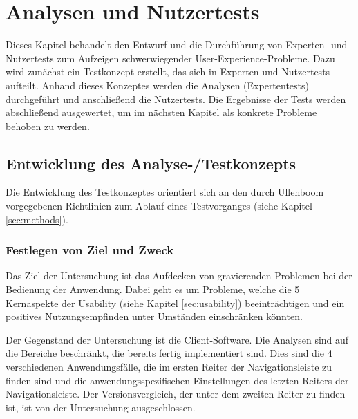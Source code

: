 \chapter{Analysen und Nutzertests} \label{sec:analysisTests}
Dieses Kapitel behandelt den Entwurf und die Durchführung von Experten- und Nutzertests zum Aufzeigen schwerwiegender User-Experience-Probleme. Dazu wird zunächst ein Testkonzept erstellt, das sich in Experten und Nutzertests aufteilt. Anhand dieses Konzeptes werden die Analysen (Expertentests) durchgeführt und anschließend die Nutzertests. Die Ergebnisse der Tests werden abschließend ausgewertet, um im nächsten Kapitel als konkrete Probleme behoben zu werden.\par
\section{Entwicklung des Analyse-/Testkonzepts} \label{sec:analysisConcept}
Die Entwicklung des Testkonzeptes orientiert sich an den durch Ullenboom vorgegebenen Richtlinien zum Ablauf eines Testvorganges (siehe Kapitel \ref{sec:methods}).\par
\subsection{Festlegen von Ziel und Zweck}
Das Ziel der Untersuchung ist das Aufdecken von gravierenden Problemen bei der Bedienung der Anwendung. Dabei geht es um Probleme, welche die 5 Kernaspekte der Usability (siehe Kapitel \ref{sec:usability}) beeinträchtigen und ein positives Nutzungsempfinden unter Umständen einschränken könnten.\par
Der Gegenstand der Untersuchung ist die Client-Software. Die Analysen sind auf die Bereiche beschränkt, die bereits fertig implementiert sind. Dies sind die 4 verschiedenen Anwendungsfälle, die im ersten Reiter der Navigationsleiste zu finden sind und die anwendungsspezifischen Einstellungen des letzten Reiters der Navigationsleiste. Der Versionsvergleich, der unter dem zweiten Reiter zu finden ist, ist von der Untersuchung ausgeschlossen.\par%
